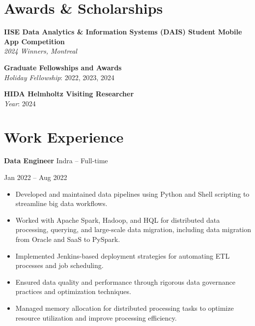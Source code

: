 \documentclass[10pt, letterpaper]{article}
\newenvironment{highlights}{
    \begin{itemize}[
        topsep=0.10 cm,
        parsep=0.10 cm,
        partopsep=0pt,
        itemsep=0pt,
        leftmargin=0 cm + 10pt
    ]
}{
    \end{itemize}
} %
\newenvironment{twocolentry}[2][]{
    \onecolentry
    \def\secondColumn{#2}
    \setcolumnwidth{\fill, 4.5 cm}
    \begin{paracol}{2}
}{
    \switchcolumn \raggedleft \secondColumn
    \end{paracol}
    \endonecolentry
} %
\begin{document}
        \section*{Awards \& Scholarships}

        \noindent \textbf{IISE Data Analytics \& Information Systems (DAIS) Student Mobile App Competition} \\
        \textit{2024 Winners, Montreal} \\
        
        
        \vspace{0.5em} %
        
        \noindent \textbf{Graduate Fellowships and Awards} \\
        \textit{Holiday Fellowship}: 2022, 2023, 2024 \\
        
        \vspace{0.5em} %
        
        \noindent \textbf{HIDA Helmholtz Visiting Researcher} \\
        \textit{Year}: 2024

        
\section*{Work Experience}

\begin{twocolentry}{Jan 2022 – Aug 2022}
    \textbf{Data Engineer} \textbar Indra – Full-time
\end{twocolentry}
\begin{highlights}
    \item Developed and maintained data pipelines using Python and Shell scripting to streamline big data workflows.
    \item Worked with Apache Spark, Hadoop, and HQL for distributed data processing, querying, and large-scale data migration, including data migration from Oracle and SaaS to PySpark.
    \item Implemented Jenkins-based deployment strategies for automating ETL processes and job scheduling.
    \item Ensured data quality and performance through rigorous data governance practices and optimization techniques.
    \item Managed memory allocation for distributed processing tasks to optimize resource utilization and improve processing efficiency.
\end{highlights}
\end{document}
